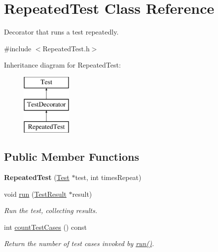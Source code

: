 \hypertarget{class_repeated_test}{}\section{Repeated\+Test Class Reference}
\label{class_repeated_test}


Decorator that runs a test repeatedly.  




{\ttfamily \#include $<$Repeated\+Test.\+h$>$}

Inheritance diagram for Repeated\+Test\+:\begin{figure}[H]
\begin{center}
\leavevmode
\includegraphics[height=3.000000cm]{class_repeated_test}
\end{center}
\end{figure}
\subsection*{Public Member Functions}
\begin{DoxyCompactItemize}
\item 
{\bfseries Repeated\+Test} (\hyperlink{class_test}{Test} $\ast$test, int times\+Repeat)\hypertarget{class_repeated_test_a73cf84a81085a1e93f21f2f4d2a14bc6}{}\label{class_repeated_test_a73cf84a81085a1e93f21f2f4d2a14bc6}

\item 
void \hyperlink{class_repeated_test_a6faffcd29b619305a75dd4c1995beaad}{run} (\hyperlink{class_test_result}{Test\+Result} $\ast$result)\hypertarget{class_repeated_test_a6faffcd29b619305a75dd4c1995beaad}{}\label{class_repeated_test_a6faffcd29b619305a75dd4c1995beaad}

\begin{DoxyCompactList}\small\item\em Run the test, collecting results. \end{DoxyCompactList}\item 
int \hyperlink{class_repeated_test_a2bacf360b91cc6a0c52ec9e75ceae5a6}{count\+Test\+Cases} () const 
\begin{DoxyCompactList}\small\item\em Return the number of test cases invoked by \hyperlink{class_repeated_test_a6faffcd29b619305a75dd4c1995beaad}{run()}. \end{DoxyCompactList}\end{DoxyCompactItemize}

